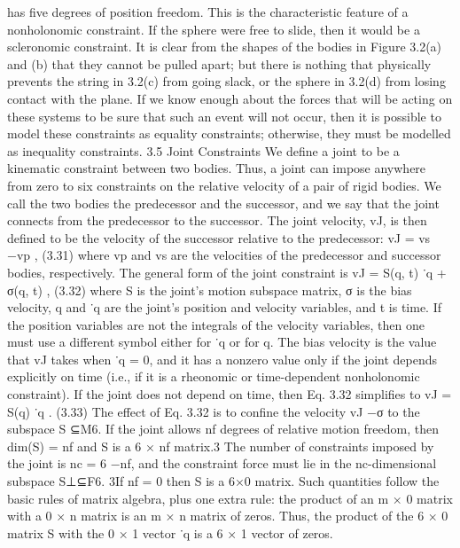 has five degrees of position freedom. This is the characteristic feature of a nonholonomic constraint. If the sphere were free to slide, then it would be a scleronomic constraint. It is clear from the shapes of the bodies in Figure 3.2(a) and (b) that they cannot be pulled apart; but there is nothing that physically prevents the string in 3.2(c) from going slack, or the sphere in 3.2(d) from losing contact with the plane. If we know enough about the forces that will be acting on these systems to be sure that such an event will not occur, then it is possible to model these constraints as equality constraints; otherwise, they must be modelled as inequality constraints. 3.5 Joint Constraints We define a joint to be a kinematic constraint between two bodies. Thus, a joint can impose anywhere from zero to six constraints on the relative velocity of a pair of rigid bodies. We call the two bodies the predecessor and the successor, and we say that the joint connects from the predecessor to the successor. The joint velocity, vJ, is then defined to be the velocity of the successor relative to the predecessor: vJ = vs −vp , (3.31) where vp and vs are the velocities of the predecessor and successor bodies, respectively. The general form of the joint constraint is vJ = S(q, t) ˙q + σ(q, t) , (3.32) where S is the joint’s motion subspace matrix, σ is the bias velocity, q and ˙q are the joint’s position and velocity variables, and t is time. If the position variables are not the integrals of the velocity variables, then one must use a different symbol either for ˙q or for q. The bias velocity is the value that vJ takes when ˙q = 0, and it has a nonzero value only if the joint depends explicitly on time (i.e., if it is a rheonomic or time-dependent nonholonomic constraint). If the joint does not depend on time, then Eq. 3.32 simplifies to vJ = S(q) ˙q . (3.33) The effect of Eq. 3.32 is to confine the velocity vJ −σ to the subspace S ⊆M6. If the joint allows nf degrees of relative motion freedom, then dim(S) = nf and S is a 6 × nf matrix.3 The number of constraints imposed by the joint is nc = 6 −nf, and the constraint force must lie in the nc-dimensional subspace S⊥⊆F6. 3If nf = 0 then S is a 6×0 matrix. Such quantities follow the basic rules of matrix algebra, plus one extra rule: the product of an m × 0 matrix with a 0 × n matrix is an m × n matrix of zeros. Thus, the product of the 6 × 0 matrix S with the 0 × 1 vector ˙q is a 6 × 1 vector of zeros.


